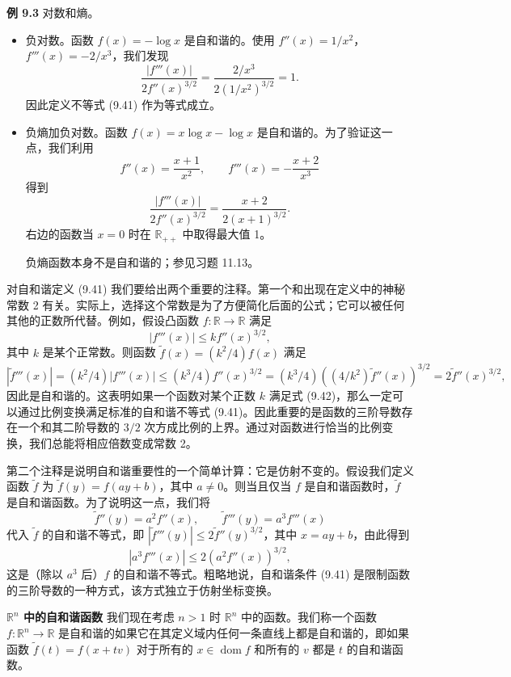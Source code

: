 \documentclass[UTF8, 12pt, fontset=fandol, oneside]{ctexart}
\begin{document}
\noindent\textbf{例 9.3}\quad
对数和熵。
\begin{itemize}
\item 负对数。函数 $f(x)=-\log x$ 是自和谐的。使用 $f''(x)=1/x^2$，$f'''(x)=-2/x^3$，我们发现
\[
\frac{|f'''(x)|}{2f''(x)^{3/2}}=\frac{2/x^3}{2(1/x^2)^{3/2}}=1.
\]
因此定义不等式 (9.41) 作为等式成立。
\item 负熵加负对数。函数 $f(x)=x\log x-\log x$ 是自和谐的。为了验证这一点，我们利用
\[
f''(x)=\frac{x+1}{x^2},\qquad f'''(x)=-\frac{x+2}{x^3}
\]
得到
\[
\frac{|f'''(x)|}{2f''(x)^{3/2}}=\frac{x+2}{2(x+1)^{3/2}}.
\]
右边的函数当 $x=0$ 时在 $\mathbb{R}_{++}$ 中取得最大值 1。

负熵函数本身不是自和谐的；参见习题 11.13。
\end{itemize}

对自和谐定义 (9.41) 我们要给出两个重要的注释。第一个和出现在定义中的神秘常数 2 有关。实际上，选择这个常数是为了方便简化后面的公式；它可以被任何其他的正数所代替。例如，假设凸函数 $f:\mathbb{R}\to\mathbb{R}$ 满足
\begin{equation}
|f'''(x)|\leq kf''(x)^{3/2},
\tag{9.42}
\end{equation}
其中 $k$ 是某个正常数。则函数 $\tilde{f}(x)=(k^2/4)f(x)$ 满足
\[
|\tilde{f}'''(x)|=(k^2/4)|f'''(x)|
\leq (k^3/4)f''(x)^{3/2}
= (k^3/4)\left((4/k^2)\tilde{f}''(x)\right)^{3/2}
=2\tilde{f}''(x)^{3/2},
\]
因此是自和谐的。这表明如果一个函数对某个正数 $k$ 满足式 (9.42)，那么一定可以通过比例变换满足标准的自和谐不等式 (9.41)。因此重要的是函数的三阶导数存在一个和其二阶导数的 $3/2$ 次方成比例的上界。通过对函数进行恰当的比例变换，我们总能将相应倍数变成常数 2。

第二个注释是说明自和谐重要性的一个简单计算：它是仿射不变的。假设我们定义函数 $\tilde{f}$ 为 $\tilde{f}(y)=f(ay+b)$，其中 $a\neq0$。则当且仅当 $f$ 是自和谐函数时，$\tilde{f}$ 是自和谐函数。为了说明这一点，我们将
\[
\tilde{f}''(y)=a^2f''(x),\qquad \tilde{f}'''(y)=a^3f'''(x)
\]
代入 $\tilde{f}$ 的自和谐不等式，即 $|\tilde{f}'''(y)|\leq2\tilde{f}''(y)^{3/2}$，其中 $x=ay+b$，由此得到
\[
|a^3f'''(x)|\leq2(a^2f''(x))^{3/2},
\]
这是（除以 $a^3$ 后）$f$ 的自和谐不等式。粗略地说，自和谐条件 (9.41) 是限制函数的三阶导数的一种方式，该方式独立于仿射坐标变换。

\noindent\textbf{$\mathbb{R}^n$ 中的自和谐函数}\quad
我们现在考虑 $n>1$ 时 $\mathbb{R}^n$ 中的函数。我们称一个函数 $f:\mathbb{R}^n\to\mathbb{R}$ 是自和谐的如果它在其定义域内任何一条直线上都是自和谐的，即如果函数 $\tilde{f}(t)=f(x+tv)$ 对于所有的 $x\in\operatorname{dom} f$ 和所有的 $v$ 都是 $t$ 的自和谐函数。
\end{document}
